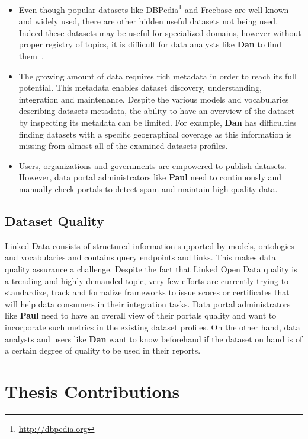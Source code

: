 \documentclass[a4paper,11pt,twoside]{ThesisStyle}
\begin{document}
\begin{itemize}
	\item Even though popular datasets like DBPedia\footnote{\url{http://dbpedia.org}} and Freebase are well known and widely used, there are other hidden useful datasets not being used. Indeed these datasets may be useful for specialized domains, however without proper registry of topics, it is difficult for data analysts like \textbf{Dan} to find them~\cite{Lalithsena:WI:13}.
	\item The growing amount of data requires rich metadata in order to reach its full potential. This metadata enables dataset discovery, understanding, integration and maintenance. Despite the various models and vocabularies describing datasets metadata, the ability to have an overview of the dataset by inspecting its metadata can be limited. For example, \textbf{Dan} has difficulties finding datasets with a specific geographical coverage as this information is missing from almost all of the examined datasets profiles.
	\item Users, organizations and governments are empowered to publish datasets. However, data portal administrators like \textbf{Paul} need to continuously and manually check portals to detect spam and maintain high quality data.
\end{itemize}

\subsection{Dataset Quality}

Linked Data consists of structured information supported by models, ontologies and vocabularies and contains query endpoints and links. This makes data quality assurance a challenge. Despite the fact that Linked Open Data quality is a trending and highly demanded topic, very few efforts are currently trying to standardize, track and formalize frameworks to issue scores or certificates that will help data consumers in their integration tasks. Data portal administrators like \textbf{Paul} need to have an overall view of their portals quality and want to incorporate such metrics in the existing dataset profiles. On the other hand, data analysts and users like \textbf{Dan} want to know beforehand if the dataset on hand is of a certain degree of quality to be used in their reports.


\section{Thesis Contributions} \label{section:contribution}
\end{document}
